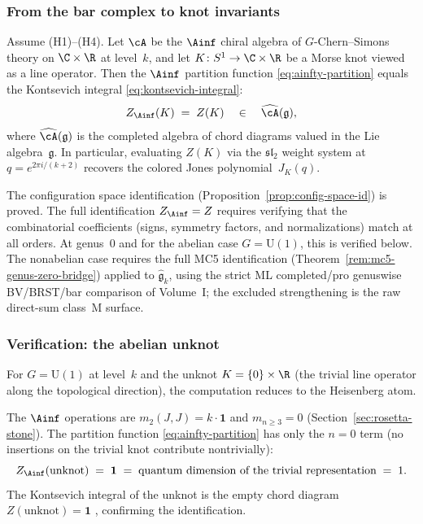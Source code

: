 \subsubsection{From the bar complex to knot invariants}

\begin{conjecture}
Assume \textrm{(H1)--(H4)}. Let $\cA$ be the $\Ainf$ chiral
algebra of $G$-Chern--Simons theory on $\C \times \R$ at
level~$k$, and let $K \colon S^1 \to \C \times \R$ be a Morse
knot viewed as a line operator. Then the $\Ainf$ partition
function \eqref{eq:ainfty-partition} equals the Kontsevich
integral \eqref{eq:kontsevich-integral}:
\[
Z_{\Ainf}(K) \;=\; Z(K)
\quad \in \quad \widehat{\cA}(\mathfrak{g}),
\]
where $\widehat{\cA}(\mathfrak{g})$ is the completed algebra of
chord diagrams valued in the Lie algebra~$\mathfrak{g}$.
In particular, evaluating $Z(K)$ via the $\mathfrak{sl}_2$
weight system at $q = e^{2\pi i/(k+2)}$ recovers the colored
Jones polynomial~$J_K(q)$.
\end{conjecture}

\begin{remark}
The configuration space identification
(Proposition~\ref{prop:config-space-id}) is proved. The full
identification $Z_{\Ainf} = Z$ requires verifying that the
combinatorial coefficients (signs, symmetry factors, and
normalizations) match at all orders. At genus~$0$ and for the
abelian case $G = \mathrm{U}(1)$, this is verified below. The
nonabelian case requires the full MC5 identification
(Theorem~\ref{rem:mc5-genus-zero-bridge}) applied to
$\widehat{\mathfrak{g}}_k$, using the strict ML completed/pro
genuswise BV/BRST/bar comparison of Volume~I; the excluded
strengthening is the raw direct-sum class~M surface.
\end{remark}

\subsubsection{Verification: the abelian unknot}

For $G = \mathrm{U}(1)$ at level~$k$ and the unknot
$K = \{0\} \times \R$ (the trivial line operator along the
topological direction), the computation reduces to the Heisenberg
atom.

The $\Ainf$ operations are $m_2(J, J) = k \cdot \mathbf{1}$ and
$m_{n \geq 3} = 0$ (Section~\ref{sec:rosetta-stone}). The
partition function \eqref{eq:ainfty-partition} has only the
$n = 0$ term (no insertions on the trivial knot contribute
nontrivially):
\[
Z_{\Ainf}(\text{unknot}) \;=\; \mathbf{1}
\;=\; \text{quantum dimension of the trivial representation}
\;=\; 1.
\]
The Kontsevich integral of the unknot is the empty chord diagram
$Z(\text{unknot}) = \mathbf{1}$ \cite{Kon94}, confirming the
identification.

